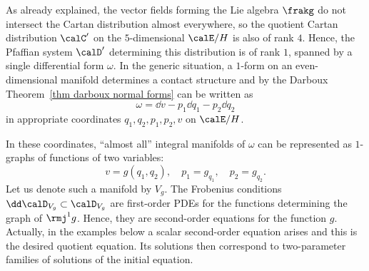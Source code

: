As already explained, the vector fields forming the Lie algebra $\frakg$ do not intersect the Cartan distribution almost everywhere, so the quotient Cartan distribution $\calC'$ on the $5$-dimensional $\calE\slash H$ is also of rank $4$. Hence, the Pfaffian system $\calD'$ determining this distribution is of rank $1$, spanned by a single differential form $\omega$. In the generic situation, a $1$-form on an even-dimensional manifold determines a contact structure and by the Darboux Theorem~\ref{thm darboux normal forms} can be written as 
\[\omega=\dd v-p_1 \dd q_1-p_2\dd q_2 \]
in appropriate coordinates $q_1,q_2,p_1,p_2,v$ on $\calE\slash H$. 

In these coordinates, ``almost all'' integral manifolds of $\omega$ can be represented as $1$-graphs of functions of two variables:
\[v=g(q_1,q_2),\quad p_1=g_{q_1},\quad p_2=g_{q_2}.\]
Let us denote such a manifold by $V_g$. The Frobenius conditions $\dd\calD_{V_g}\subset\calD_{V_g}$ are first-order PDEs for the functions determining the graph of $\rmj^1 g$. Hence, they are second-order equations for the function $g$. Actually, in the examples below a scalar second-order equation arises and this is the desired quotient equation. Its solutions then correspond to two-parameter families of solutions of the initial equation.



